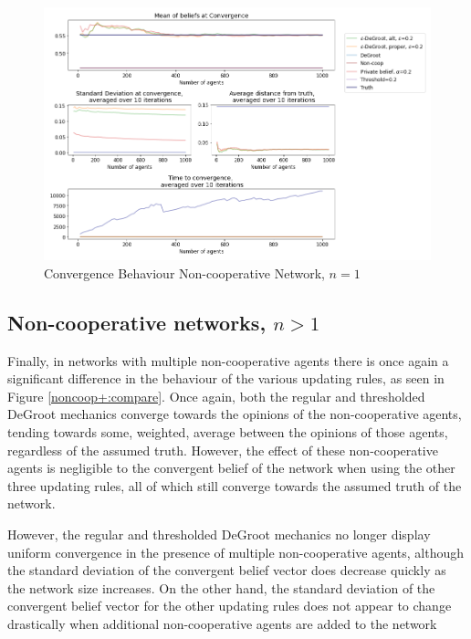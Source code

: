 \documentclass{article}
\begin{document}
\begin{center}
    \begin{figure}[!htbp]
        \centering
        \includegraphics[width=1.2\textwidth]{ThesisKI/Images/WisdomCompare1.png}
        \caption{Convergence Behaviour Non-cooperative Network, $n=1$}
        \label{noncoop1:compare}
    \end{figure}
\end{center}

\newpage

\subsection{Non-cooperative networks, $n > 1$}

Finally, in networks with multiple non-cooperative agents there is once again a significant difference in the behaviour of the various updating rules, as seen in Figure \ref{noncoop+:compare}. Once again, both the regular and thresholded DeGroot mechanics converge towards the opinions of the non-cooperative agents, tending towards some, weighted, average between the opinions of those agents, regardless of the assumed truth. However, the effect of these non-cooperative agents is negligible to the convergent belief of the network when using the other three updating rules, all of which still converge towards the assumed truth of the network. 

\noindent However, the regular and thresholded DeGroot mechanics no longer display uniform convergence in the presence of multiple non-cooperative agents, although the standard deviation of the convergent belief vector does decrease quickly as the network size increases. On the other hand, the standard deviation of the convergent belief vector for the other updating rules does not appear to change drastically when additional non-cooperative agents are added to the network
\end{document}
